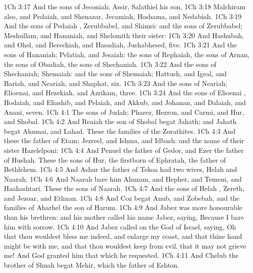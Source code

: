 \vs 1Ch 3:17 And the sons of Jeconiah; Assir, Salathiel his son,
\vs 1Ch 3:18 Malchiram also, and Pedaiah, and Shenazar, Jecamiah, Hoshama, and Nedabiah.
\vs 1Ch 3:19 And the sons of Pedaiah , Zerubbabel, and Shimei: and the sons of Zerubbabel; Meshullam, and Hananiah, and Shelomith their sister:
\vs 1Ch 3:20 And Hashubah, and Ohel, and Berechiah, and Hasadiah, Jushabhesed, five.
\vs 1Ch 3:21 And the sons of Hananiah; Pelatiah, and Jesaiah: the sons of Rephaiah, the sons of Arnan, the sons of Obadiah, the sons of Shechaniah.
\vs 1Ch 3:22 And the sons of Shechaniah; Shemaiah: and the sons of Shemaiah; Hattush, and Igeal, and Bariah, and Neariah, and Shaphat, six.
\vs 1Ch 3:23 And the sons of Neariah; Elioenai, and Hezekiah, and Azrikam, three.
\vs 1Ch 3:24 And the sons of Elioenai , Hodaiah, and Eliashib, and Pelaiah, and Akkub, and Johanan, and Dalaiah, and Anani, seven.
\vs 1Ch 4:1 The sons of Judah; Pharez, Hezron, and Carmi, and Hur, and Shobal.
\vs 1Ch 4:2 And Reaiah the son of Shobal begat Jahath; and Jahath begat Ahumai, and Lahad. These  the families of the Zorathites.
\vs 1Ch 4:3 And these  the father of Etam; Jezreel, and Ishma, and Idbash: and the name of their sister  Hazelelponi:
\vs 1Ch 4:4 And Penuel the father of Gedor, and Ezer the father of Hushah. These  the sons of Hur, the firstborn of Ephratah, the father of Bethlehem.
\vs 1Ch 4:5 And Ashur the father of Tekoa had two wives, Helah and Naarah.
\vs 1Ch 4:6 And Naarah bare him Ahuzam, and Hepher, and Temeni, and Haahashtari. These  the sons of Naarah.
\vs 1Ch 4:7 And the sons of Helah , Zereth, and Jezoar, and Ethnan.
\vs 1Ch 4:8 And Coz begat Anub, and Zobebah, and the families of Aharhel the son of Harum.
\vs 1Ch 4:9 And Jabez was more honourable than his brethren: and his mother called his name Jabez, saying, Because I bare him with sorrow.
\vs 1Ch 4:10 And Jabez called on the God of Israel, saying, Oh that thou wouldest bless me indeed, and enlarge my coast, and that thine hand might be with me, and that thou wouldest keep  from evil, that it may not grieve me! And God granted him that which he requested.
\vs 1Ch 4:11 And Chelub the brother of Shuah begat Mehir, which  the father of Eshton.
